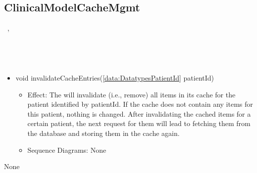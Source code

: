   \subsection{ClinicalModelCacheMgmt}\label{int:InterfacesClinicalModelCacheMgmt}
    \begin{description}
      \item[Provided by:] \iconcomponent{}~, \iconcomponent{}~
      \item[Required by:] \iconcomponent{}~ 
      \item[Operations:] ~
    \begin{itemize}[noitemsep,nolistsep,leftmargin=-.25cm]
      \item \textsf{void invalidateCacheEntries(\ref{data:DatatypesPatientId} patientId)}
        \begin{itemize}[noitemsep,nolistsep]
           \item Effect: The  will invalidate (i.e., remove) all items in its cache for the patient identified by patientId. If the cache does not contain any items for this patient,
nothing is changed. After invalidating the cached items for a certain patient, the next request for them will lead to fetching them from the database and storing them in the cache
again. 
           \item Sequence Diagrams: None
        \end{itemize}
    \end{itemize}
      \item[Diagrams:] None
    \end{description}

